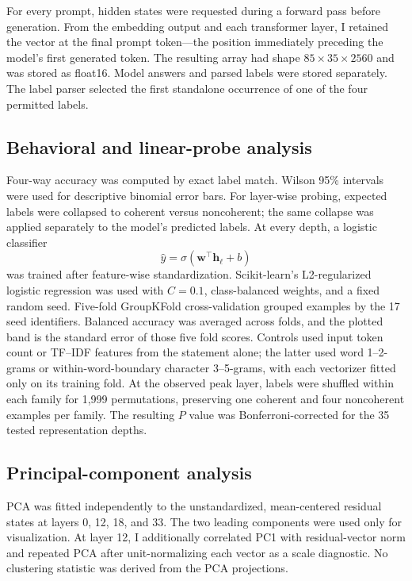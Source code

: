 \documentclass[pdflatex,sn-nature]{sn-jnl}
\begin{document}
For every prompt, hidden states were requested during a forward pass before generation. From the embedding output and each transformer layer, I retained the vector at the final prompt token---the position immediately preceding the model's first generated token. The resulting array had shape $85\times35\times2560$ and was stored as float16. Model answers and parsed labels were stored separately. The label parser selected the first standalone occurrence of one of the four permitted labels.

\subsection{Behavioral and linear-probe analysis}

Four-way accuracy was computed by exact label match. Wilson 95\% intervals were used for descriptive binomial error bars. For layer-wise probing, expected labels were collapsed to coherent versus noncoherent; the same collapse was applied separately to the model's predicted labels. At every depth, a logistic classifier
\begin{equation}
\hat{y}=\sigma(\mathbf{w}^{\top}\mathbf{h}_{\ell}+b)
\end{equation}
was trained after feature-wise standardization. Scikit-learn's L2-regularized logistic regression was used with $C=0.1$, class-balanced weights, and a fixed random seed. Five-fold GroupKFold cross-validation grouped examples by the 17 seed identifiers. Balanced accuracy was averaged across folds, and the plotted band is the standard error of those five fold scores. Controls used input token count or TF--IDF features from the statement alone; the latter used word 1--2-grams or within-word-boundary character 3--5-grams, with each vectorizer fitted only on its training fold. At the observed peak layer, labels were shuffled within each family for 1,999 permutations, preserving one coherent and four noncoherent examples per family. The resulting $P$ value was Bonferroni-corrected for the 35 tested representation depths.

\subsection{Principal-component analysis}

PCA was fitted independently to the unstandardized, mean-centered residual states at layers 0, 12, 18, and 33. The two leading components were used only for visualization. At layer 12, I additionally correlated PC1 with residual-vector norm and repeated PCA after unit-normalizing each vector as a scale diagnostic. No clustering statistic was derived from the PCA projections.
\end{document}
